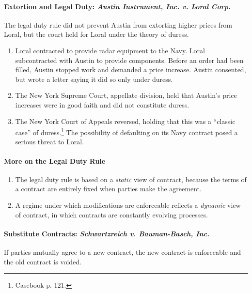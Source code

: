 \paragraph{Extortion and Legal Duty: \emph{Austin Instrument, Inc. v. Loral 
Corp.}}

The legal duty rule did not prevent Austin from extorting higher prices from Loral, 
but the court held for Loral under the theory of duress.

\begin{enumerate}
    \item Loral contracted to provide radar equipment to the Navy. Loral 
    subcontracted with Austin to provide components. Before an order had been 
    filled, Austin stopped work and demanded a price increase. Austin 
    consented, but wrote a letter saying it did so only under duress.
    \item The New York Supreme Court, appellate division, held that Austin's 
    price increases were in good faith and did not constitute duress.
    \item The New York Court of Appeals reversed, holding that this was a 
    ``classic case'' of duress.\footnote{Casebook p. 121.} The possibility of 
    defaulting on its Navy contract posed a serious threat to Loral. 
\end{enumerate}

\paragraph{More on the Legal Duty Rule}

\begin{enumerate}
    \item The legal duty rule is based on a \emph{static} view of contract, 
    because the terms of a contract are entirely fixed when parties make the 
    agreement.
    \item A regime under which modifications are enforceable reflects a 
    \emph{dynamic} view of contract, in which contracts are constantly 
    evolving processes.
\end{enumerate}

\paragraph{Substitute Contracts: \emph{Schwartzreich v. Bauman-Basch, Inc.}}

If parties mutually agree to a new contract, the new contract is enforceable 
and the old contract is voided.

